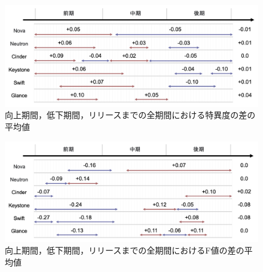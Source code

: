 \documentclass[submit]{ipsj}
\begin{document}
\begin{figure}[t]
\begin{center}
    \includegraphics[width=1.0\textwidth]{Uenaka_fig/RQ2_result/merge_S.pdf}
    \caption{向上期間，低下期間，リリースまでの全期間における特異度の差の平均値}
    \label{fig:merge_prepare_S}
\end{center}
\end{figure}

\begin{figure}[t]
\begin{center}
    \includegraphics[width=1.0\textwidth]{Uenaka_fig/RQ2_result/merge_F.pdf}
    \caption{向上期間，低下期間，リリースまでの全期間におけるF値の差の平均値}
    \label{fig:merge_prepare_F}
\end{center}
\end{figure}
\end{document}
